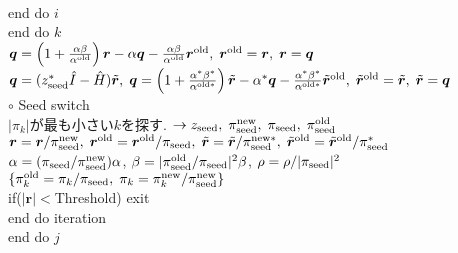 \documentclass[12pt,titlepage]{jarticle}
\begin{document}
\\\hspace{1.5cm}
end do $i$
\\\hspace{1.0cm}
end do $k$
\\\hspace{1.0cm}
${\boldsymbol q} = \left( 1 + \frac{\alpha \beta}{\alpha^{\rm old}} \right) {\boldsymbol r}
- \alpha {\boldsymbol q} - \frac{\alpha \beta}{\alpha^{\rm old}} {\boldsymbol r}^{\rm old},\; 
{\boldsymbol r}^{\rm old} = {\boldsymbol r},\; {\boldsymbol r} = {\boldsymbol q}$
\\\hspace{1.0cm}
${\boldsymbol q} = (z_{\rm seed}^* {\hat I} - {\hat H}) {\tilde {\boldsymbol r}},\;
{\boldsymbol q} = \left( 1 + \frac{\alpha^* \beta^*}{\alpha^{{\rm old} *}} \right) {\tilde {\boldsymbol r}}
- \alpha^* {\boldsymbol q} - \frac{\alpha^* \beta^*}{\alpha^{{\rm old} *}} {\tilde {\boldsymbol r}}^{\rm old},\; 
{\tilde {\boldsymbol r}}^{\rm old} = {\tilde {\boldsymbol r}},\; {\tilde {\boldsymbol r}} = {\boldsymbol q}$
\\\hspace{1.0cm}
$\circ$ Seed switch
\\\hspace{1.0cm}
$|\pi_k|$が最も小さい$k$を探す. 
$\rightarrow z_{\rm seed},\; \pi_{\rm seed}^{\rm new},\; \pi_{\rm seed},\; \pi_{\rm seed}^{\rm old} $
\\\hspace{1.0cm}
${\boldsymbol r} = {\boldsymbol r} / \pi_{\rm seed}^{\rm new},\; 
{\boldsymbol r}^{\rm old} = {\boldsymbol r}^{\rm old} / \pi_{\rm seed},\; 
{\tilde {\boldsymbol r}} = {\tilde {\boldsymbol r}} / \pi_{\rm seed}^{{\rm new} *},\; 
{\tilde {\boldsymbol r}}^{\rm old} = {\tilde {\boldsymbol r}}^{\rm old} / \pi_{\rm seed}^*$
\\\hspace{1.0cm}
$\alpha = (\pi_{\rm seed} / \pi_{\rm seed}^{\rm new}) \alpha$,
$\beta = |\pi_{\rm seed}^{\rm old} / \pi_{\rm seed}|^2 \beta$,
$\rho = \rho / |\pi_{\rm seed}|^2$
\\\hspace{1.0cm}
$\{\pi_k^{\rm old} = \pi_k / \pi_{\rm seed},\; \pi_k = \pi_k^{\rm new} / \pi_{\rm seed}^{\rm new}\}$
\\\hspace{1.0cm}
if($|{\boldsymbol r}| < $Threshold) exit
\\\hspace{0.5cm}
end do iteration
\\
end do $j$
\end{document}
